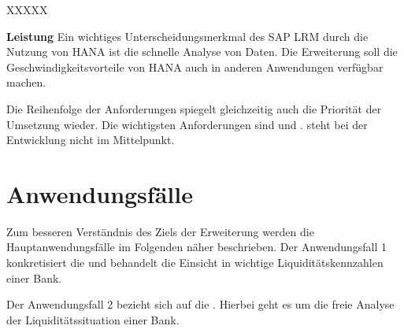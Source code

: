 \begin{onehalfspacing}
\begin{seToplist}{ XXXXX }
\item[\anfl{leistung}] \textbf{Leistung} \newline
Ein wichtiges Unterscheidungsmerkmal des SAP LRM durch die Nutzung von \gls{HANA} ist die schnelle Analyse von Daten. Die Erweiterung soll die Geschwindigkeitsvorteile von \gls{HANA} auch in anderen Anwendungen verfügbar machen.

\end{seToplist}

Die Reihenfolge der Anforderungen spiegelt gleichzeitig auch die Priorität der Umsetzung wieder. Die wichtigsten Anforderungen sind  und .  steht bei der Entwicklung nicht im Mittelpunkt.

\section{Anwendungsfälle}
Zum besseren Verständnis des Ziels der Erweiterung werden die Hauptanwendungsfälle im Folgenden näher beschrieben. Der Anwendungsfall 1 konkretisiert die  und behandelt die Einsicht in wichtige Liquiditätskennzahlen einer Bank.


Der Anwendungsfall 2 bezieht sich auf die . Hierbei geht es um die freie Analyse der Liquiditätssituation einer Bank.

\end{onehalfspacing}
